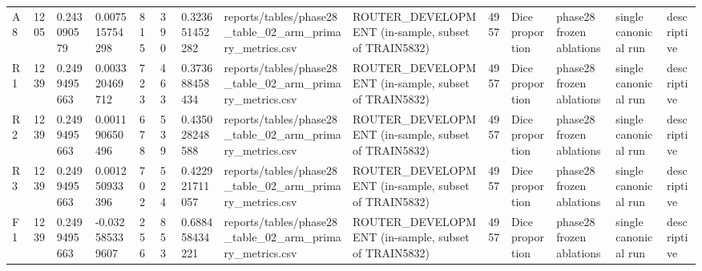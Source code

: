 \begin{tabular}{llllllllllllll}
A8 & 1205 & 0.243090579 & 0.007515754298 & 815 & 390 & 0.323651452282 & reports/tables/phase28\_table\_02\_arm\_primary\_metrics.csv & ROUTER\_DEVELOPMENT (in-sample, subset of TRAIN5832) & 4957 & Dice proportion & phase28 frozen ablations & single canonical run & descriptive \\
R1 & 1239 & 0.2499495663 & 0.003320469712 & 723 & 463 & 0.373688458434 & reports/tables/phase28\_table\_02\_arm\_primary\_metrics.csv & ROUTER\_DEVELOPMENT (in-sample, subset of TRAIN5832) & 4957 & Dice proportion & phase28 frozen ablations & single canonical run & descriptive \\
R2 & 1239 & 0.2499495663 & 0.001190650496 & 678 & 539 & 0.435028248588 & reports/tables/phase28\_table\_02\_arm\_primary\_metrics.csv & ROUTER\_DEVELOPMENT (in-sample, subset of TRAIN5832) & 4957 & Dice proportion & phase28 frozen ablations & single canonical run & descriptive \\
R3 & 1239 & 0.2499495663 & 0.001250933396 & 702 & 524 & 0.422921711057 & reports/tables/phase28\_table\_02\_arm\_primary\_metrics.csv & ROUTER\_DEVELOPMENT (in-sample, subset of TRAIN5832) & 4957 & Dice proportion & phase28 frozen ablations & single canonical run & descriptive \\
F1 & 1239 & 0.2499495663 & -0.032585339607 & 256 & 853 & 0.688458434221 & reports/tables/phase28\_table\_02\_arm\_primary\_metrics.csv & ROUTER\_DEVELOPMENT (in-sample, subset of TRAIN5832) & 4957 & Dice proportion & phase28 frozen ablations & single canonical run & descriptive \\
\hline
\end{tabular}
